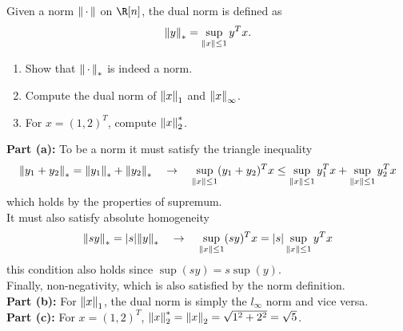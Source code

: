 \documentclass[11pt]{article}
\begin{document}
\begin{homeworkProblem}
    Given a norm $\norm{\, \cdot \, }$ on $\R[n]$, the dual norm is defined as
    \[
        \norm{y}_* = \sup_{\norm{x} \leq 1} y^T x.
    \]
    \begin{enumerate}[label=(\alph*), topsep=5pt, itemsep=2.5pt]
        \item Show that $\norm{\, \cdot \, }_*$ is indeed a norm.
        \item Compute the dual norm of $\norm{x}_1$ and $\norm{x}_\infty$.
        \item For $x = (1, 2)^T$, compute $\norm{x}_2^*$.
    \end{enumerate} \vspace{1\baselineskip}

    \solution

    \textbf{Part (a):} To be a norm it must satisfy the triangle inequality
    \[
        \norm{y_1 + y_2}_* = \norm{y_1}_* + \norm{y_2}_* \quad\to\quad \sup_{\norm{x} \leq 1} (y_1 + y_2)^T x \leq \sup_{\norm{x} \leq 1} y_1^T x + \sup_{\norm{x} \leq 1} y_2^T x
    \]
    which holds by the properties of supremum. \\

    It must also satisfy absolute homogeneity
    \[
        \norm{s y}_* = |s| \norm{y}_* \quad\to\quad \sup_{\norm{x} \leq 1} (s y)^T x = |s| \sup_{\norm{x} \leq 1} y^T x
    \]
    this condition also holds since $\sup(s y) = s \sup(y)$. \\

    Finally, non-negativity, which is also satisfied by the norm definition. \\

    \textbf{Part (b):} For $\norm{x}_1$, the dual norm is simply the $l_\infty$ norm and vice versa. \\

    \textbf{Part (c):} For $x = (1, 2)^T$, $\norm{x}_2^* = \norm{x}_2 = \sqrt{1^2 + 2^2} = \sqrt{5}$.


\end{homeworkProblem}
\end{document}
